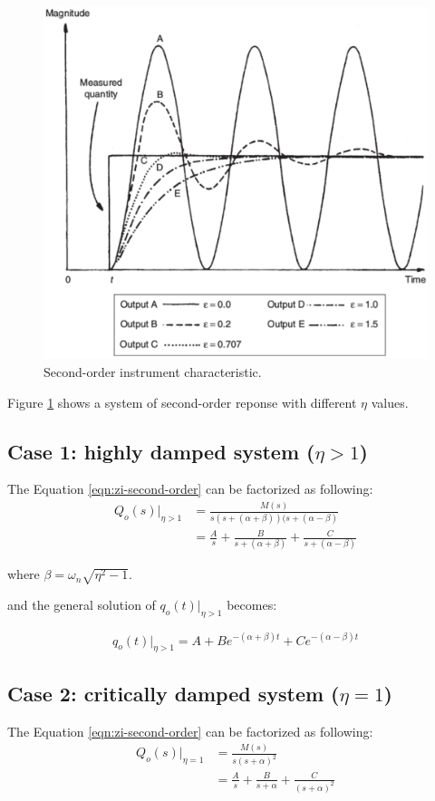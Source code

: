 \documentclass[a4paper,11pt]{book}
\begin{document}
\begin{figure}[h!]\label{fig:second-order}
\centering
  \includegraphics[width=0.7\linewidth]{second-order}
  \caption{Second-order instrument characteristic. } 
\end{figure}

Figure \ref{fig:second-order} shows a system of second-order reponse with different $\eta$ values.

\subsection*{Case 1: highly damped system ($\eta > 1$)}

The Equation \ref{eqn:zi-second-order} can be factorized as following:
\begin{align*}
Q_o(s)|_{\eta>1} &= \frac{M(s)}{s(s + (\alpha + \beta))(s + (\alpha - \beta)} \\
&= \frac{A}{s} + \frac{B}{s + (\alpha + \beta)} + \frac{C}{s + (\alpha - \beta)}
\end{align*}

where $\beta = \omega_n\sqrt{\eta^2 - 1}$.

and the general solution of $q_o(t)|_{\eta>1}$ becomes:

\begin{equation}
q_o(t)|_{\eta>1} = A + Be^{-(\alpha+\beta)t}+Ce^{-(\alpha-\beta)t}
\end{equation}

\subsection*{Case 2: critically damped system ($\eta = 1$)}

The Equation \ref{eqn:zi-second-order} can be factorized as following:
\begin{align*}
Q_o(s)|_{\eta=1} &= \frac{M(s)}{s(s +\alpha)^2} \\
&= \frac{A}{s} + \frac{B}{s + \alpha} + \frac{C}{(s + \alpha)^2}
\end{align*}
\end{document}
